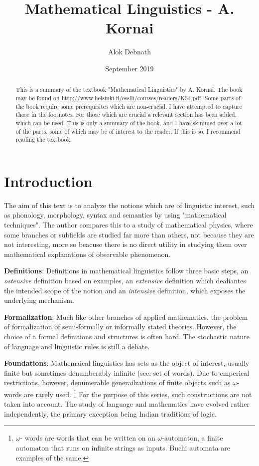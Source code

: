\documentclass{report}
\title{Mathematical Linguistics - A. Kornai}
\author{Alok Debnath}
\date{September 2019}
\begin{document}
\maketitle
\begin{abstract}
  This is a summary of the textbook "Mathematical Linguistics" by A. Kornai.
  The book may be found on
  \url{http://www.helsinki.fi/esslli/courses/readers/K54.pdf}.
  Some parts of the book require some prerequisites which are non-crucial. I
  have attempted to capture those in the footnotes. For those which are crucial
  a relevant section has been added, which can be used. This is only a summary
  of the book, and I have skimmed over a lot of the parts, some of which may
  be of interest to the reader. If this is so, I recommend reading the
  textbook.
\end{abstract}

\chapter{Introduction}

The aim of this text is to analyze the notions which are of linguistic
interest, such as phonology, morphology, syntax and semantics by using
"mathematical techniques". The author compares this to a study of mathematical
physics, where some branches or subfields are studied far more than others, not
because they are not interesting, more so beacuse there is no direct utility in
studying them over mathematical explanations of observable phenomenon.

\textbf{Definitions}: Definitions in mathematical linguistics follow three
basic steps, an \textit{ostensive} definition based on examples, an
\textit{extensive} definition which dealiantes the intended scope of the notion
and an \textit{intensive} definition, which exposes the underlying mechanism.

\textbf{Formalization}: Much like other branches of applied mathematics, the
problem of formalization of semi-formally or informally stated theories.
However, the choice of a formal definitions and structures is often hard. The
stochastic nature of language and linguistic rules is still a debate.

\textbf{Foundations}: Mathemaical linguistics has sets as the object of
interest, usually finite but sometimes denumberably infinite (see: set of
words). Due to emperical restrictions, however, denumerable generailzations
of finite objects such as $\omega$-words are rarely used. \footnote{$\omega$-
  words are words that can be written on an $\omega$-automaton, a finite 
automaton that runs on infinite strings as inputs. Buchi automata are examples
of the same.} For the purpose of this series, such constructions are not taken
into account. The study of language and mathematics have evolved rather
independently, the primary exception being Indian traditions of logic.
\end{document}
